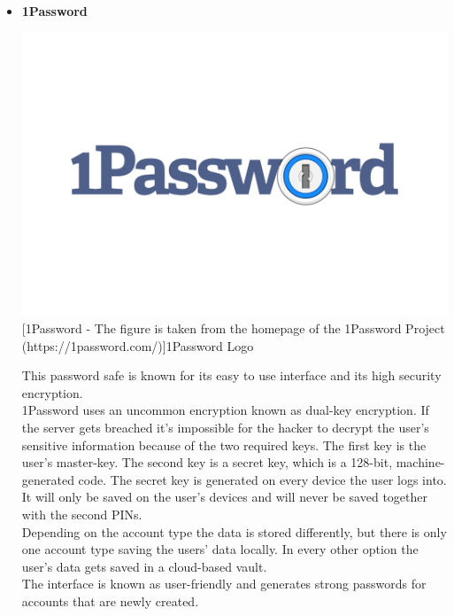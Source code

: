 \documentclass[conference]{IEEEtran}
\begin{document}
\begin{itemize}
    \item \textbf{1Password}\\
          \begin{center}
              \includegraphics[scale=0.06]{./images/1Password-Logo.wine.png}
              [1Password - The figure is taken from the homepage of the 1Password Project (https://1password.com/)]{1Password Logo}
          \end{center}
          This password safe is known for its easy to use interface and its high security encryption.\\
          1Password uses an uncommon encryption known as dual-key encryption. If the server gets breached it's impossible for the hacker to decrypt the user's sensitive information because of the two required keys. The first key is the user's master-key. The second key is a secret key, which is a 128-bit, machine-generated code. The secret key is generated on every device the user logs into. It will only be saved on the user's devices and will never be saved together with the second PINs.\\
          Depending on the account type the data is stored differently, but there is only one account type saving the users' data locally. In every other option the user's data gets saved in a cloud-based vault.\\
          The interface is known as user-friendly and generates strong passwords for accounts that are newly created.
          \cite{b7}

\end{itemize}
\end{document}
